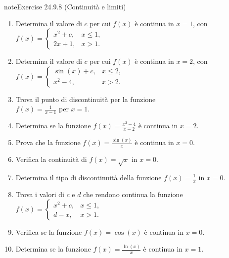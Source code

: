 \documentclass[letterpaper,10pt,italian]{jupyterBook}
\begin{document}
\begin{sphinxadmonition}{note}{Exercise 24.9.8 (Continuità e limiti)}


\begin{enumerate}
%
\item {} 
\sphinxAtStartPar
Determina il valore di \(c\) per cui \(f(x)\) è continua in \(x=1\), con\\
\(f(x) = \begin{cases} 
x^2 + c, & x \leq 1, \\
2x + 1, & x > 1.
\end{cases}\)

\item {} 
\sphinxAtStartPar
Determina il valore di \(c\) per cui \(f(x)\) è continua in \(x=2\), con\\
\(f(x) = \begin{cases} 
\sin(x) + c, & x \leq 2, \\
x^2 - 4, & x > 2.
\end{cases}\)

\item {} 
\sphinxAtStartPar
Trova il punto di discontinuità per la funzione\\
\(f(x) = \frac{1}{x - 1}\) per \(x = 1\).

\item {} 
\sphinxAtStartPar
Determina se la funzione \(f(x) = \frac{x^2 - 4}{x - 2}\) è continua in \(x=2\).

\item {} 
\sphinxAtStartPar
Prova che la funzione \(f(x) = \frac{\sin(x)}{x}\) è continua in \(x=0\).

\item {} 
\sphinxAtStartPar
Verifica la continuità di \(f(x) = \sqrt{x}\) in \(x=0\).

\item {} 
\sphinxAtStartPar
Determina il tipo di discontinuità della funzione \(f(x) = \frac{1}{x}\) in \(x=0\).

\item {} 
\sphinxAtStartPar
Trova i valori di \(c\) e \(d\) che rendono continua la funzione\\
\(f(x) = \begin{cases} 
x^2 + c, & x \leq 1, \\
d - x, & x > 1.
\end{cases}\)

\item {} 
\sphinxAtStartPar
Verifica se la funzione \(f(x) = \cos(x)\) è continua in \(x=0\).

\item {} 
\sphinxAtStartPar
Determina se la funzione \(f(x) = \frac{\ln(x)}{x}\) è continua in \(x=1\).

\end{enumerate}
\end{sphinxadmonition}
 \label{exercise:ch/infinitesimal_calculus/analysis-problems-exercise-8}
\end{document}
